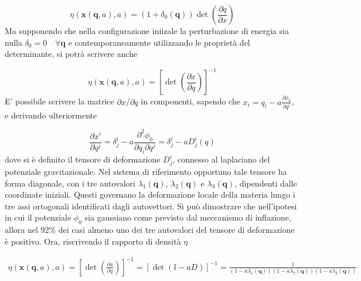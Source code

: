 \begin{equation}
    \eta(\bm{x}(\bm{q}, a), a) = (1 + \delta_0(\bm{q}))\det\left(\frac{\partial q}{\partial x}\right) 
\end{equation}
Ma supponendo che nella configurazione iniizale la perturbazione di energia sia nulla $\delta_0 = 0 \quad \forall \bm{q}$
e contemporaneamente utilizzando le proprietà del determinante, si potrà scrivere anche

\begin{equation}
    \eta(\bm{x}(\bm{q}, a), a) = \left[\det\left(\frac{\partial x}{\partial q}\right)\right]^{-1}
\end{equation}
E' possibile scrivere la matrice $\partial x$/$\partial q$ in componenti, sapendo che $x_i = q_i - a \frac{\partial\phi_0}{\partial q^i}$, 
e derivando ulteriormente 

\begin{equation}
    \frac{\partial x^i}{\partial q^j} = \delta^i_j - a \frac{\partial^2 \phi_0}{\partial q_i \partial q^j} = 
    \delta^i_j - a D^i_j(q)
\end{equation}
dove si è definito il tensore di deformazione $D^i_j$, connesso al laplaciano del potenziale gravitazionale. 
Nel sistema di riferimento opportuno tale tensore ha forma
diagonale, con i tre autovalori $\lambda_1(\bm{q})$, $\lambda_2(\bm{q})$ e $\lambda_3(\bm{q})$, dipendenti dalle
coordinate iniziali. Questi governano la deformazione locale della materia lungo i tre assi ortogonali identificati
dagli autovettori. Si può dimostrare che nell'ipotesi in cui il potenziale $\phi_0$ sia gaussiano come previsto
dal meccanismo di inflazione, allora nel 92$\%$ dei casi almeno uno dei tre autovalori del tensore di deformazione è positivo.
Ora, riscrivendo il rapporto di densità $\eta$

\begin{multline}
    \eta(\bm{x}(\bm{q}, a), a) = \left[\det\left(\frac{\partial x}{\partial q}\right)\right]^{-1} = \left[\det\left( \mathbb{I}- a D \right)\right]^{-1}
    = \frac{1}{(1-a\lambda_1(\bm{q}))(1-a\lambda_2(\bm{q}))(1-a\lambda_3(\bm{q}))}
\end{multline}


